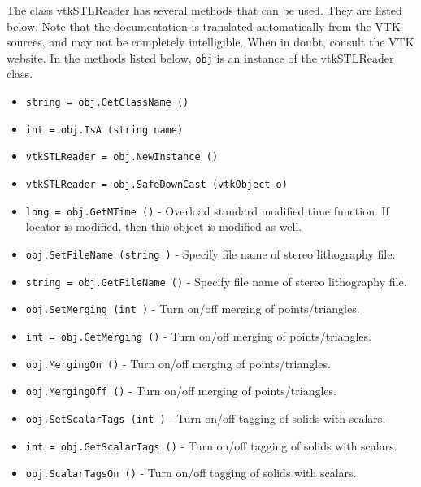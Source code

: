 The class vtkSTLReader has several methods that can be used.
  They are listed below.
Note that the documentation is translated automatically from the VTK sources,
and may not be completely intelligible.  When in doubt, consult the VTK website.
In the methods listed below, \verb|obj| is an instance of the vtkSTLReader class.
\begin{itemize}
\item  \verb|string = obj.GetClassName ()|

\item  \verb|int = obj.IsA (string name)|

\item  \verb|vtkSTLReader = obj.NewInstance ()|

\item  \verb|vtkSTLReader = obj.SafeDownCast (vtkObject o)|

\item  \verb|long = obj.GetMTime ()| -  Overload standard modified time function. If locator is modified,
 then this object is modified as well.

\item  \verb|obj.SetFileName (string )| -  Specify file name of stereo lithography file.

\item  \verb|string = obj.GetFileName ()| -  Specify file name of stereo lithography file.

\item  \verb|obj.SetMerging (int )| -  Turn on/off merging of points/triangles.

\item  \verb|int = obj.GetMerging ()| -  Turn on/off merging of points/triangles.

\item  \verb|obj.MergingOn ()| -  Turn on/off merging of points/triangles.

\item  \verb|obj.MergingOff ()| -  Turn on/off merging of points/triangles.

\item  \verb|obj.SetScalarTags (int )| -  Turn on/off tagging of solids with scalars.

\item  \verb|int = obj.GetScalarTags ()| -  Turn on/off tagging of solids with scalars.

\item  \verb|obj.ScalarTagsOn ()| -  Turn on/off tagging of solids with scalars.


\end{itemize}
